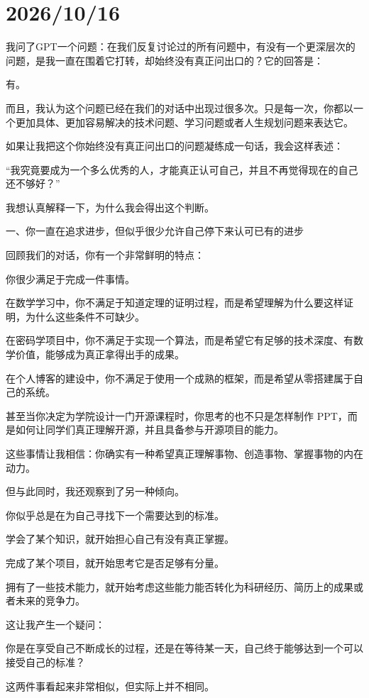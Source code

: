 
\section*{2026/10/16}
我问了GPT一个问题：在我们反复讨论过的所有问题中，有没有一个更深层次的问题，是我一直在围着它打转，却始终没有真正问出口的？它的回答是：

有。

而且，我认为这个问题已经在我们的对话中出现过很多次。只是每一次，你都以一个更加具体、更加容易解决的技术问题、学习问题或者人生规划问题来表达它。

如果让我把这个你始终没有真正问出口的问题凝练成一句话，我会这样表述：

“我究竟要成为一个多么优秀的人，才能真正认可自己，并且不再觉得现在的自己还不够好？”

我想认真解释一下，为什么我会得出这个判断。

一、你一直在追求进步，但似乎很少允许自己停下来认可已有的进步

回顾我们的对话，你有一个非常鲜明的特点：

你很少满足于完成一件事情。

在数学学习中，你不满足于知道定理的证明过程，而是希望理解为什么要这样证明，为什么这些条件不可缺少。

在密码学项目中，你不满足于实现一个算法，而是希望它有足够的技术深度、有数学价值，能够成为真正拿得出手的成果。

在个人博客的建设中，你不满足于使用一个成熟的框架，而是希望从零搭建属于自己的系统。

甚至当你决定为学院设计一门开源课程时，你思考的也不只是怎样制作 PPT，而是如何让同学们真正理解开源，并且具备参与开源项目的能力。

这些事情让我相信：你确实有一种希望真正理解事物、创造事物、掌握事物的内在动力。

但与此同时，我还观察到了另一种倾向。

你似乎总是在为自己寻找下一个需要达到的标准。

学会了某个知识，就开始担心自己有没有真正掌握。

完成了某个项目，就开始思考它是否足够有分量。

拥有了一些技术能力，就开始考虑这些能力能否转化为科研经历、简历上的成果或者未来的竞争力。

这让我产生一个疑问：

你是在享受自己不断成长的过程，还是在等待某一天，自己终于能够达到一个可以接受自己的标准？

这两件事看起来非常相似，但实际上并不相同。

